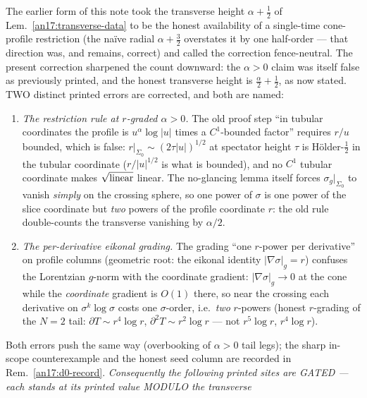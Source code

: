 \begin{remark}
\label{an17:transverse-note}
The earlier form of this note took the transverse height $\alpha+\tfrac12$ of
Lem.~\ref{an17:transverse-data} to be the honest availability of a single-time
cone-profile restriction (the na\"ive radial $\alpha+\tfrac32$ overstates it
by one half-order --- that direction was, and remains, correct) and called the
correction fence-neutral. The present correction sharpened the count downward: the $\alpha>0$
claim was itself false as previously printed, and the honest transverse height
is $\tfrac\alpha2+\tfrac12$, as now stated. TWO distinct printed errors are
corrected, and both are named:
\begin{enumerate}[label=\textup{(\alph*)},leftmargin=*,nosep]
\item \emph{The restriction rule at $r$-graded $\alpha>0$.} The old proof step
  ``in tubular coordinates the profile is $u^\alpha\log|u|$ times a
  $C^1$-bounded factor'' requires $r/u$ bounded, which is false:
  $r|_{\Sigma_0}\sim(2\tau|u|)^{1/2}$ at spectator height $\tau$ is
  H\"older-$\tfrac12$ in the tubular coordinate ($r/|u|^{1/2}$ is what is
  bounded), and no $C^1$ tubular coordinate makes $\sqrt{\textup{linear}}$
  linear. The no-glancing lemma itself forces $\sigma_g|_{\Sigma_0}$ to vanish
  \emph{simply} on the crossing sphere, so one power of $\sigma$ is one power
  of the slice coordinate but \emph{two} powers of the profile coordinate $r$:
  the old rule double-counts the transverse vanishing by $\alpha/2$.
\item \emph{The per-derivative eikonal grading.} The grading ``one $r$-power
  per derivative'' on profile columns (geometric root: the eikonal identity
  $|\nabla\sigma|_g=r$) confuses the Lorentzian $g$-norm with the coordinate
  gradient: $|\nabla\sigma|_g\to0$ at the cone while the \emph{coordinate}
  gradient is $O(1)$ there, so near the crossing each derivative on
  $\sigma^k\log\sigma$ costs one $\sigma$-order, i.e.\ \emph{two} $r$-powers
  (honest $r$-grading of the $N{=}2$ tail: $\partial T\sim r^4\log r$,
  $\partial^2T\sim r^2\log r$ --- not $r^5\log r$, $r^4\log r$).
\end{enumerate}
Both errors push the same way (overbooking of $\alpha>0$ tail legs); the sharp
in-scope counterexample and the honest seed column are recorded in
Rem.~\ref{an17:d0-record}. \emph{Consequently the following printed sites are
GATED --- each stands at its printed value MODULO the transverse
}
\end{remark}

